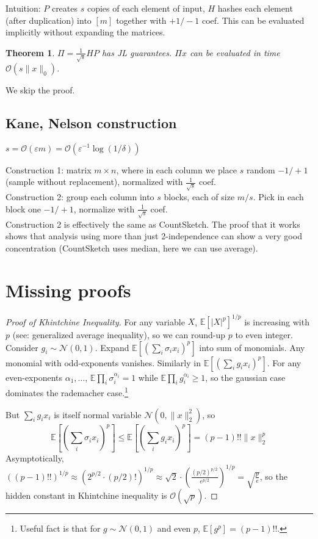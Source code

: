 \documentclass[11pt]{article}
\newtheorem{theorem}{Theorem}
\newcommand{\E}{{\mathbb E}}
\newcommand{\eps}{\varepsilon}
\newcommand{\bigo}{\mathcal{O}}
\begin{document}
Intuition:
$P$ creates $s$ copies of each element of input, $H$ hashes each element (after duplication) into $[m]$ together with $+1/-1$ coef. This can be evaluated implicitly without expanding the matrices.


\begin{theorem}
$\Pi = \frac{1}{\sqrt{s}}HP$ has JL guarantees. $\Pi x$ can be evaluated in time $\bigo(s \|x\|_0)$.
\end{theorem}
We skip the proof.

\subsection{Kane, Nelson construction}
$s = \bigo(\eps m) = \bigo(\varepsilon^{-1} \log(1/\delta))$

Construction 1: matrix $m \times n$, where in each column we place $s$ random $-1/+1$ (sample without replacement), normalized with $\frac{1}{\sqrt{s}}$ coef.\\
Construction 2: group each column into $s$ blocks, each of size $m/s$. Pick in each block one $-1/+1$, normalize with $\frac{1}{\sqrt{s}}$ coef.\\

Construction 2 is effectively the same as \textsf{CountSketch}. The proof that it works shows that analysis using more than just 2-independence can show a very good concentration (CountSketch uses median, here we can use average).


\section{Missing proofs}
\begin{proof}[Proof of Khintchine Inequality]
For any variable $X$, $\E[|X|^p]^{1/p}$ is increasing with $p$ (see: generalized average inequality), so we can round-up $p$ to even integer. Consider $g_i \sim \mathcal{N}(0,1)$.
Expand $\E[ (\sum_i \sigma_i x_i)^p]$ into sum of monomials. Any monomial with odd-exponents vanishes. Similarly in $\E[ (\sum_i g_i x_i)^p ]$. For any even-exponents $\alpha_1,\ldots$, $\E \prod_i \sigma_i^{\alpha_i} = 1$ while $\E \prod_i g_i^{\alpha_i} \ge 1$, so the gaussian case dominates the rademacher case.\footnote{Useful fact is that for $g \sim \mathcal{N}(0,1)$ and even $p$, $\E[g^p] = (p-1)!!$.}

But $\sum_i g_i x_i$ is itself normal variable $\mathcal{N}(0,\|x\|_2^2)$, so
$$\E[ (\sum_i \sigma_i x_i)^p ] \le \E[ (\sum_i g_i x_i)^p ] =  (p-1)!! \|x\|_2^p$$
Asymptotically, $((p-1)!!)^{1/p} \approx (2^{p/2} \cdot (p/2)!)^{1/p} \approx \sqrt{2} \cdot \left(\frac{(p/2)^{p/2}}{e^{p/2}} \right)^{1/p} = \sqrt{\frac{p}{e}}$, so the hidden constant in Khintchine inequality is $\bigo(\sqrt{p})$.

\end{proof}



\end{document}
